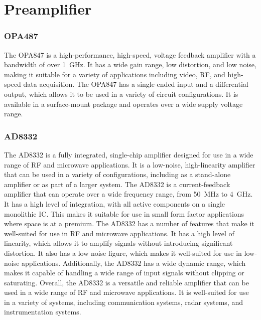 \section{Preamplifier}
\subsubsection{OPA487}
The OPA847\cite{OPA847} is a high-performance, high-speed, voltage feedback amplifier with a bandwidth of over \qty{1}{\giga\hertz}. It has a wide gain range, low distortion, and low noise, making it suitable for a variety of applications including video, RF, and high-speed data acquisition. The OPA847 has a single-ended input and a differential output, which allows it to be used in a variety of circuit configurations. It is available in a surface-mount package and operates over a wide supply voltage range.

\subsubsection{AD8332}
The AD8332\cite{AD8332} is a fully integrated, single-chip amplifier designed for use in a wide range of RF and microwave applications. It is a low-noise, high-linearity amplifier that can be used in a variety of configurations, including as a stand-alone amplifier or as part of a larger system. The AD8332 is a current-feedback amplifier that can operate over a wide frequency range, from \qty{50}{\mega\hertz} to \qty{4}{\giga\hertz}. It has a high level of integration, with all active components on a single monolithic IC. This makes it suitable for use in small form factor applications where space is at a premium. The AD8332 has a number of features that make it well-suited for use in RF and microwave applications. It has a high level of linearity, which allows it to amplify signals without introducing significant distortion. It also has a low noise figure, which makes it well-suited for use in low-noise applications. Additionally, the AD8332 has a wide \gls{dynamic range}, which makes it capable of handling a wide range of input signals without clipping or saturating. Overall, the AD8332 is a versatile and reliable amplifier that can be used in a wide range of RF and microwave applications. It is well-suited for use in a variety of systems, including communication systems, radar systems, and instrumentation systems.

